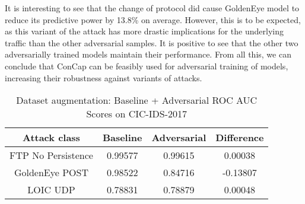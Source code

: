 It is interesting to see that the change of protocol did cause GoldenEye model to reduce its predictive power by 13.8\% on average. However, this is to be expected, as this variant of the attack has more drastic implications for the underlying traffic than the other adversarial samples. It is positive to see that the other two adversarially trained models maintain their performance. From all this, we can conclude that ConCap can be feasibly used for adversarial training of models, increasing their robustness against variants of attacks.

\begin{table}
	\centering
	\caption{Dataset augmentation: Baseline + Adversarial ROC AUC Scores on CIC-IDS-2017}
	\begin{tabular}{|c|c|c|c|}
		\hline
		Attack class & Baseline & Adversarial & Difference\\
		\hline
		FTP No Persistence & 0.99577 & 0.99615 & 0.00038\\
		GoldenEye POST & 0.98522 & 0.84716 & -0.13807\\
		LOIC UDP & 0.78831 & 0.78879 & 0.00048\\
		\hline
	\end{tabular}
	\label{tab:sanity}
\end{table}